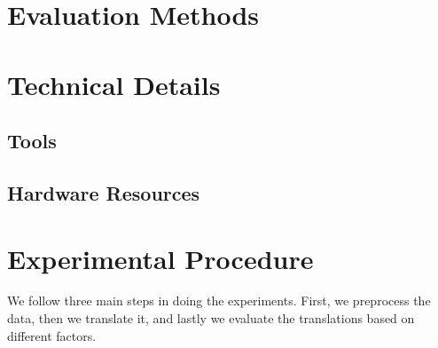 
\section{Evaluation Methods}
\label{sec:Experiments:Evaluation}



\section{Technical Details}
\label{sec:Experiments:Technical}


\subsection{Tools}
\label{sec:Experiments:Tools}


\subsection{Hardware Resources}
\label{sec:Experiments:Hardware}


\section{Experimental Procedure}
\label{sec:Experiments:Procedure}

We follow three main steps in doing the experiments. First, we preprocess the data, then we translate it, and lastly we evaluate the translations based on different factors.

